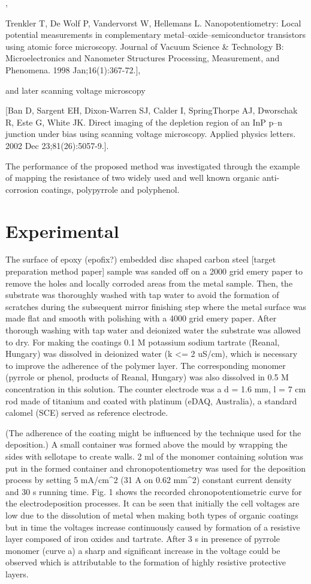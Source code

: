 \documentclass[3p]{elsarticle}
\begin{document}
,

Trenkler T, De Wolf P, Vandervorst W, Hellemans L. Nanopotentiometry: Local potential measurements in complementary metal–oxide–semiconductor transistors using atomic force microscopy. Journal of Vacuum Science & Technology B: Microelectronics and Nanometer Structures Processing, Measurement, and Phenomena. 1998 Jan;16(1):367-72.],


and later scanning voltage microscopy


[Ban D, Sargent EH, Dixon-Warren SJ, Calder I, SpringThorpe AJ, Dworschak R, Este G, White JK. Direct imaging of the depletion region of an InP p–n junction under bias using scanning voltage microscopy. Applied physics letters. 2002 Dec 23;81(26):5057-9.]. 


The performance of the proposed method was investigated through the example of mapping the resistance of two widely used and well known organic anti-corrosion coatings, polypyrrole and polyphenol.

\section{Experimental}
The surface of epoxy (epofix?) embedded disc shaped carbon steel [target preparation method paper] sample was sanded off on a 2000 grid emery paper to remove the holes and locally corroded areas from the metal sample. Then, the substrate was thoroughly washed with tap water to avoid the formation of scratches during the subsequent mirror finishing step where the metal surface was made flat and smooth with polishing with a 4000 grid emery paper. After thorough washing with tap water and deionized water the substrate was allowed to dry.
For making the coatings 0.1 M potassium sodium tartrate (Reanal, Hungary) was dissolved in deionized water (k <= 2 uS/cm), which is necessary to improve the adherence of the polymer layer. The corresponding monomer (pyrrole or phenol, products of Reanal, Hungary) was also dissolved in 0.5 M concentration in this solution. The counter electrode was a d = 1.6 mm, l = 7 cm rod made of titanium and coated with platinum (eDAQ, Australia), a standard calomel (SCE) served as reference electrode.

(The adherence of the coating might be influenced by the technique used for the deposition.) A small container was formed above the mould by wrapping the sides with sellotape to create walls. 2 ml of the monomer containing solution was put in the formed container and chronopotentiometry was used for the deposition process by setting 5 mA/cm^2 (31 A on 0.62 mm^2) constant current density and 30 s running time. Fig. 1 shows the recorded chronopotentiometric curve for the electrodeposition processes. It can be seen that initially the cell voltages are low due to the dissolution of metal when making both types of organic coatings but in time the voltages increase continuously caused by formation of a resistive layer composed of iron oxides and tartrate. After 3 s in presence of pyrrole monomer (curve a) a sharp and significant increase in the voltage could be observed which is attributable to the formation of highly resistive protective layers.
\end{document}
